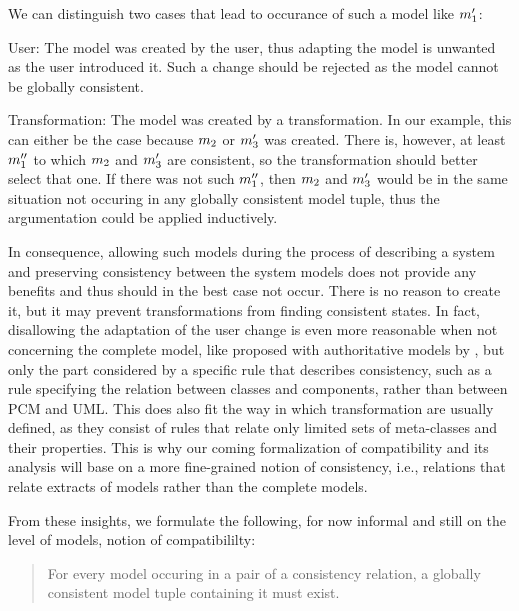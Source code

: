 We can distinguish two cases that lead to occurance of such a model like $m_{1}'$:
\begin{properdescription}
    \item[User:] The model was created by the user, thus adapting the model is unwanted as the user introduced it. Such a change should be rejected as the model cannot be globally consistent.
    \item[Transformation:] The model was created by a transformation. In our example, this can either be the case because $m_{2}$ or $m_{3}'$ was created. There is, however, at least $m_{1}''$ to which $m_{2}$ and $m_{3}'$ are consistent, so the transformation should better select that one. If there was not such $m_{1}''$, then $m_{2}$ and $m_{3}'$ would be in the same situation not occuring in any globally consistent model tuple, thus the argumentation could be applied inductively.
\end{properdescription}
In consequence, allowing such models during the process of describing a system and preserving consistency between the system models does not provide any benefits and thus should in the best case not occur.
There is no reason to create it, but it may prevent transformations from finding consistent states.
In fact, disallowing the adaptation of the user change is even more reasonable when not concerning the complete model, like proposed with authoritative models by \textcite{stevens2020BidirectionalTransformationLarge-SoSym}, but only the part considered by a specific rule that describes consistency, such as a rule specifying the relation between classes and components, rather than between \gls{PCM} and UML.
This does also fit the way in which transformation are usually defined, as they consist of rules that relate only limited sets of meta-classes and their properties.
This is why our coming formalization of compatibility and its analysis will base on a more fine-grained notion of consistency, i.e., relations that relate extracts of models rather than the complete models.

From these insights, we formulate the following, for now informal and still on the level of models, notion of compatibililty:
\begin{quote}
    For every model occuring in a pair of a consistency relation, a globally consistent model tuple containing it must exist.
\end{quote}

